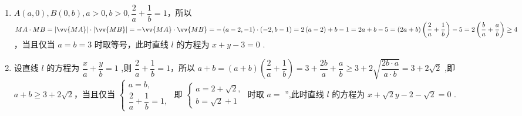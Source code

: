 \begin{enumerate}
\begin{jieda}
\begin{enumerate}
            又因为 $\dfrac{2}{a} + \dfrac{1}{b} \geq  2\sqrt{\dfrac{2}{ab}}$ ,即 $1 \geq  2\sqrt{\dfrac{2}{ab}}$ ,得 $\dfrac{1}{2}{ab} \geq  4$ ,当且仅当 $\dfrac{2}{a} = \dfrac{1}{b} = \dfrac{1}{2}$ ,即 $a = 4,b = 2$ 时等号成立,于是 $\bigtriangleup {AOB}$ 的面积 $S = \dfrac{1}{2}{ab}$ 有最小值,且最小值为 4. 此时,直线 $l$ 的方程是 $\dfrac{x}{4} + \dfrac{y}{2} = 1$ ,即 $x + {2y} - 4 = 0$
            \item $A\left( {a,0}\right) ,B\left( {0,b}\right) ,a > 0,b > 0,\dfrac{2}{a} + \dfrac{1}{b} = 1$，所以 ${MA} \cdot  {MB} = \left| \vv{MA}\right|  \cdot  \left| \vv{MB}\right|  =  - \vv{MA} \cdot  \vv{MB} =  - \left( {a - 2, - 1}\right)  \cdot  \left( {-2,b - 1}\right) = 2\left( {a - 2}\right)  + b - 1 = {2a} + b - 5 = \left( {{2a} + b}\right) \left( {\dfrac{2}{a} + \dfrac{1}{b}}\right)  - 5 = 2\left( {\dfrac{b}{a} + \dfrac{a}{b}}\right)  \geq  4$，当且仅当 $a = b = 3$ 时取等号，此时直线 $l$ 的方程为 $x + y - 3 = 0$ .
            \item 设直线 $l$ 的方程为 $\dfrac{x}{a} + \dfrac{y}{b} = 1$ ,则 $\dfrac{2}{a} + \dfrac{1}{b} = 1$，所以 $a + b = \left( {a + b}\right) \left( {\dfrac{2}{a} + \dfrac{1}{b}}\right)  = 3 + \dfrac{2b}{a} + \dfrac{a}{b} \geq  3 + 2\sqrt{\dfrac{{2b} \cdot  a}{a \cdot  b}} = 3 + 2\sqrt{2}$ ,即 $a + b \geq  3 + 2\sqrt{2}$，当且仅当 $\left\{  \begin{array}{l} a = b, \\  \dfrac{2}{a} + \dfrac{1}{b} = 1, \end{array}\right.$ 即 $\left\{  \begin{array}{l} a = 2 + \sqrt{2}, \\  b = \sqrt{2} + 1 \end{array}\right.$ 时取 $a =$ ”,此时直线 $l$ 的方程为 $x + \sqrt{2}y - 2 - \sqrt{2} = 0$ .
        \end{enumerate}
    \end{jieda}
\end{enumerate}
